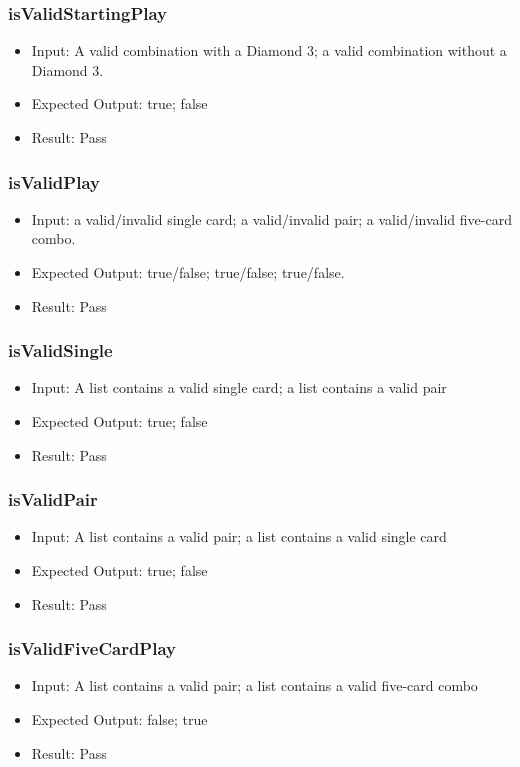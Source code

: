 \documentclass[12pt, titlepage]{article}
\begin{document}
\subsubsection{isValidStartingPlay}
\begin{itemize}
    \item Input: A valid combination with a Diamond 3; a valid combination without a Diamond 3.
    \item Expected Output: true; false
    \item Result: Pass
\end{itemize}

\subsubsection{isValidPlay}
\begin{itemize}
    \item Input: a valid/invalid single card; a valid/invalid pair; a valid/invalid five-card combo.
    \item Expected Output: true/false; true/false; true/false.
    \item Result: Pass
\end{itemize}

\subsubsection{isValidSingle}
\begin{itemize}
    \item Input: A list contains a valid single card; a list contains a valid pair
    \item Expected Output: true; false
    \item Result: Pass
\end{itemize}

\subsubsection{isValidPair}
\begin{itemize}
    \item Input: A list contains a valid pair; a list contains a valid single card
    \item Expected Output: true; false
    \item Result: Pass
\end{itemize}

\subsubsection{isValidFiveCardPlay}
\begin{itemize}
    \item Input: A list contains a valid pair; a list contains a valid five-card combo
    \item Expected Output: false; true
    \item Result: Pass
\end{itemize}
\end{document}
